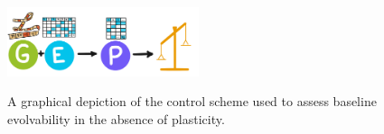\begin{figure}
    \centering
    \includegraphics[width=0.5\textwidth]{img/modelscheme} \\
    \caption{A graphical depiction of the control scheme used to assess baseline evolvability in the absence of plasticity.}
     \label{fig:control_scheme}
\end{figure}